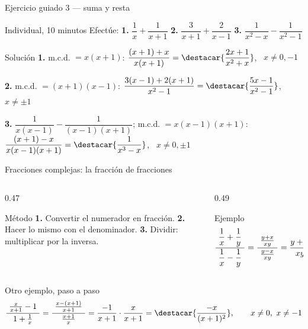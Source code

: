 \documentclass[aspectratio=169,10pt]{beamer}
\begin{document}
\begin{frame}{Ejercicio guiado 3 — suma y resta}
  \scriptsize
  \begin{alertblock}{Individual, 10 minutos}
    \tiny
    Efectúe: \quad
    \textbf{1.} $\dfrac{1}{x}+\dfrac{1}{x+1}$ \qquad
    \textbf{2.} $\dfrac{3}{x+1}+\dfrac{2}{x-1}$ \qquad
    \textbf{3.} $\dfrac{1}{x^{2}-x}-\dfrac{1}{x^{2}-1}$
  \end{alertblock}

  \vspace{0.04cm}
  \begin{block}{Solución}
    \tiny
    \textbf{1.} m.c.d. $=x(x+1)$: \quad
    $\dfrac{(x+1)+x}{x(x+1)} = \destacar{\dfrac{2x+1}{x^{2}+x}}$,
    \ $x\neq 0,-1$

    \vspace{0.08cm}
    \textbf{2.} m.c.d. $=(x+1)(x-1)$: \quad
    $\dfrac{3(x-1)+2(x+1)}{x^{2}-1}
    = \destacar{\dfrac{5x-1}{x^{2}-1}}$, \ $x\neq \pm 1$

    \vspace{0.05cm}
    \textbf{3.} $\dfrac{1}{x(x-1)}-\dfrac{1}{(x-1)(x+1)}$; m.c.d.
    $=x(x-1)(x+1)$: \quad
    $\dfrac{(x+1)-x}{x(x-1)(x+1)} = \destacar{\dfrac{1}{x^{3}-x}}$,
    \ $x\neq 0,\pm 1$
  \end{block}
\end{frame}

\begin{frame}{Fracciones complejas: la fracción de fracciones}
  \scriptsize
  \begin{columns}[T,onlytextwidth]
    \begin{column}{0.47\textwidth}
      \begin{block}{Método}
        \tiny
        \textbf{1.} Convertir el numerador en  fracción.
        \textbf{2.} Hacer lo mismo con el denominador.
        \textbf{3.} Dividir: multiplicar por la inversa.
      \end{block}
    \end{column}
    \begin{column}{0.49\textwidth}
      \begin{exampleblock}{Ejemplo}
        \tiny
        \[ \frac{\ \dfrac{1}{x}+\dfrac{1}{y}\ }
                {\ \dfrac{1}{x}-\dfrac{1}{y}\ }
         = \frac{\ \frac{y+x}{xy}\ }{\ \frac{y-x}{xy}\ }
         = \frac{y+x}{xy}\cdot\frac{xy}{y-x}
         = \destacar{\frac{x+y}{y-x}} \]
      \end{exampleblock}
    \end{column}
  \end{columns}

  \vspace{0.12cm}
  \begin{block}{Otro ejemplo, paso a paso}
    \tiny
    \[ \frac{\ \frac{x}{x+1}-1\ }{\ 1+\frac{1}{x}\ }
     = \frac{\ \frac{x-(x+1)}{x+1}\ }{\ \frac{x+1}{x}\ }
     = \frac{-1}{x+1}\cdot\frac{x}{x+1}
     = \destacar{\frac{-x}{(x+1)^{2}}}, \qquad x\neq 0,\ x\neq -1 \]
  \end{block}
\end{frame}
\end{document}
